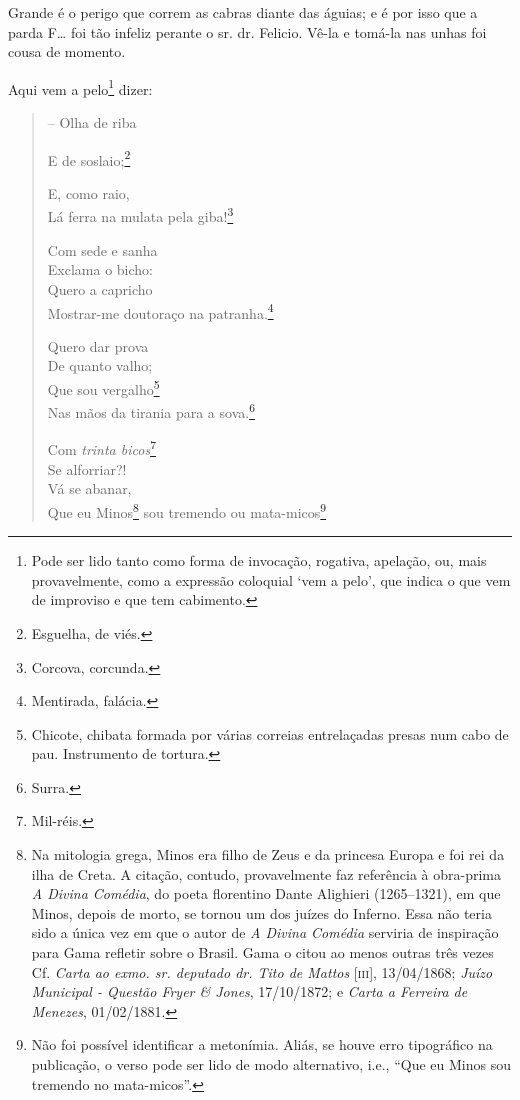 Grande é o perigo que correm as cabras diante das águias; e é por isso
que a parda F\ldots{} foi tão infeliz perante o sr. dr. Felicio. Vê-la e
tomá-la nas unhas foi cousa de momento.

Aqui vem a pelo\footnote{ Pode ser lido tanto como forma de invocação,
  rogativa, apelação, ou, mais provavelmente, como a expressão coloquial
  `vem a pelo', que indica o que vem de improviso e que tem cabimento.}
dizer:

\begin{verse}
-- Olha de riba

E de soslaio;\footnote{ Esguelha, de viés.}

E, como raio,\\
Lá ferra na mulata pela giba!\footnote{ Corcova, corcunda.}

Com sede e sanha\\
Exclama o bicho:\\
Quero a capricho\\
Mostrar-me doutoraço na patranha.\footnote{ Mentirada, falácia.}

Quero dar prova\\
De quanto valho;\\
Que sou vergalho\footnote{Chicote, chibata formada por várias correias
  entrelaçadas presas num cabo de pau. Instrumento de tortura.}\\
Nas mãos da tirania para a sova.\footnote{ Surra.}

Com \emph{trinta bicos}\footnote{ Mil-réis.}\\
Se alforriar?!\\
Vá se abanar,\\
Que eu Minos\footnote{ Na mitologia grega, Minos era filho de Zeus e da
  princesa Europa e foi rei da ilha de Creta. A citação, contudo,
  provavelmente faz referência à obra-prima \emph{A Divina Comédia}, do
  poeta florentino Dante Alighieri (1265--1321), em que Minos, depois de
  morto, se tornou um dos juízes do Inferno. Essa não teria sido a única
  vez em que o autor de \emph{A Divina Comédia} serviria de inspiração
  para Gama refletir sobre o Brasil. Gama o citou ao menos outras três
  vezes Cf. \emph{Carta ao exmo. sr. deputado dr. Tito de Mattos}
  {[}\textsc{iii}{]}, 13/04/1868; \emph{Juízo Municipal - Questão Fryer \&
  Jones}, 17/10/1872; e \emph{Carta a Ferreira de Menezes}, 01/02/1881.}
sou tremendo ou mata-micos\footnote{ Não foi possível identificar a
  metonímia. Aliás, se houve erro tipográfico na publicação, o verso
  pode ser lido de modo alternativo, i.e., ``Que eu Minos sou tremendo no
  mata-micos''.}


\end{verse}
